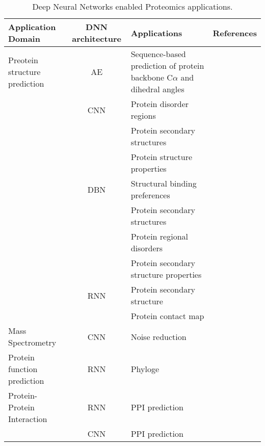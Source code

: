\begin{table}[h!]
\centering
\begin{tabular}{|| l | c | l | l ||}
    \hline
    Application Domain & DNN architecture & Applications & References\\
    \hline \hline
    Preotein structure prediction & AE & Sequence-based prediction of protein backbone C$\alpha$ and dihedral angles & \\
    & CNN & Protein disorder regions & \\
    &     & Protein secondary structures & \\
    &     & Protein structure properties & \\
    & DBN & Structural binding preferences & \\
    &     & Protein secondary structures & \\
    &     & Protein regional disorders & \\
    &     & Protein secondary structure properties & \\
    & RNN & Protein secondary structure & \\
    &     & Protein contact map & \\
    \hline 
    Mass Spectrometry & CNN & Noise reduction & \\
    \hline 
    Protein function prediction & RNN & Phyloge \\
    \hline 
    Protein-Protein Interaction & RNN & PPI prediction &  \\
    & CNN & PPI prediction & \\
    \hline \hline
\end{tabular}
\caption{Deep Neural Networks enabled Proteomics applications.}
\label{tab:PS-DNN}
\end{table}